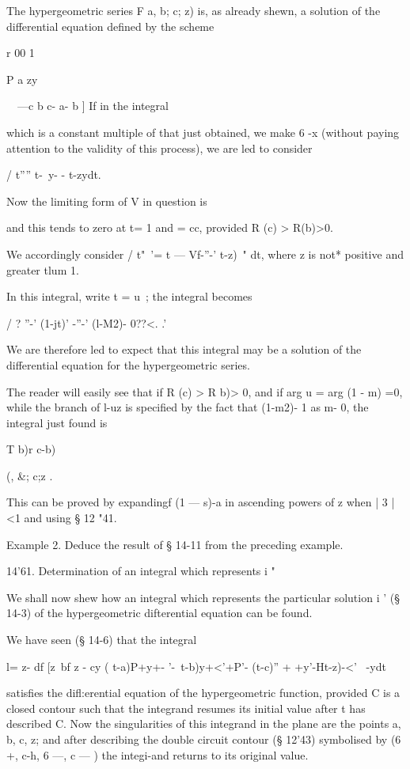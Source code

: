 The hypergeometric series F a, b; c; z) is, as already shewn, a
solution of the differential equation defined by the scheme

r 00 1 \

P a zy

\ \ —c b c- a- b ] If in the integral

which is a constant multiple of that just obtained, we make 6 -x
(without paying attention to the validity of this process), we are led
to consider

/ t'''' t-\ y- - t-zydt.

Now the limiting form of V in question is

and this tends to zero at t= 1 and = cc, provided R (c) > R(b)>0.

We accordingly consider / t"~'= t — Vf-''-' t-z)~" dt, where z is not*
positive and greater tlum 1.

In this integral, write t = u~; the integral becomes

/ ? ''-' (1-jt)' -''-' (l-M2)- 0??<. .'

We are therefore led to expect that this integral may be a solution of
the differential equation for the hypergeometric series.

The reader will easily see that if R (c) > R b)> 0, and if arg u = arg
(1 - m) =0, while the branch of l-uz is specified by the fact that
(1-m2)- 1 as m- 0, the integral just found is

T b)r c-b)

  (, \&; c;z .

This can be proved by expandingf (1 — s)-a in ascending powers of z
when | 3 | <1 and using § 12 "41.

Example 2. Deduce the result of § 14-11 from the preceding example.

14'61. Determination of an integral which represents i "\

We shall now shew how an integral which represents the particular
solution i ' (§ 14-3) of the hypergeometric difterential equation can
be found.

We have seen (§ 14-6) that the integral

l= z- df [z~bf z - cy ( t-a)P+y+- '-\ t-b)y+<'+P'- (t-c)'' +
+y'-Ht-z)-<'~ -ydt

satisfies the difl:erential equation of the hypergeometric function,
provided C is a closed contour such that the integrand resumes its
initial value after t has described C. Now the singularities of this
integrand in the plane are the points a, b, c, z; and after describing
the double circuit contour (§ 12'43) symbolised by (6 +, c-h, 6 —, c
— ) the integi-and returns to its original value.

